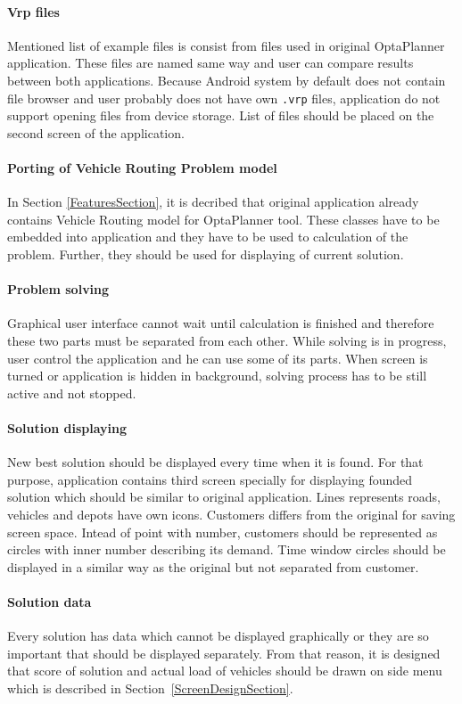 \paragraph{Vrp files}
Mentioned list of example files is consist from files used in original OptaPlanner application. These files are named
same way and user can compare results between both applications. Because Android system by default does not contain file
browser and user probably does not have own \texttt{.vrp} files, application do not support opening files from device
storage. List of files should be placed on the second screen of the application.

\paragraph{Porting of Vehicle Routing Problem model}
In Section \ref{FeaturesSection}, it is decribed that original application already contains Vehicle Routing model for
OptaPlanner tool. These classes have to be embedded into application and they have to be used to calculation of the
problem. Further, they should be used for displaying of current solution.

\paragraph{Problem solving}
Graphical user interface cannot wait until calculation is finished and therefore these two parts must be separated from
each other. While solving is in progress, user control the application and he can use some of its parts. When screen is
turned or application is hidden in background, solving process has to be still active and not stopped.

\paragraph{Solution displaying}
New best solution should be displayed every time when it is found. For that purpose, application contains third screen
specially for displaying founded solution which should be similar to original application. Lines represents roads,
vehicles and depots have own icons. Customers differs from the original for saving screen space. Intead of point with
number, customers should be represented as circles with inner number describing its demand. Time window circles should
be displayed in a similar way as the original but not separated from customer.

\paragraph{Solution data}
Every solution has data which cannot be displayed graphically or they are so important that should be displayed
separately. From that reason, it is designed that score of solution and actual load of vehicles should be drawn on side
menu which is described in Section~\ref{ScreenDesignSection}.

